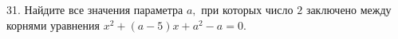 31. Найдите все значения параметра $a,$ при которых число $2$ заключено между корнями уравнения $x^2+(a-5)x+a^2-a=0.$\\
